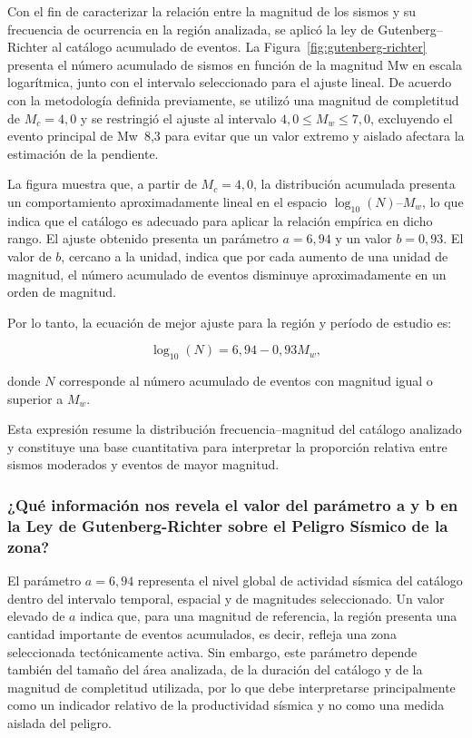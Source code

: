 \documentclass[a4paper,12pt]{article} %
\numberwithin{equation}{section} %
\numberwithin{figure}{section} %
\begin{document}
Con el fin de caracterizar la relación entre la magnitud de los sismos y su frecuencia de ocurrencia en la región analizada, se aplicó la ley de Gutenberg--Richter al catálogo acumulado de eventos. La Figura~\ref{fig:gutenberg-richter} presenta el número acumulado de sismos en función de la magnitud Mw en escala logarítmica, junto con el intervalo seleccionado para el ajuste lineal. De acuerdo con la metodología definida previamente, se utilizó una magnitud de completitud de $M_c = 4{,}0$ y se restringió el ajuste al intervalo $4{,}0 \leq M_w \leq 7{,}0$, excluyendo el evento principal de Mw~8{,}3 para evitar que un valor extremo y aislado afectara la estimación de la pendiente.

La figura muestra que, a partir de $M_c = 4{,}0$, la distribución acumulada presenta un comportamiento aproximadamente lineal en el espacio $\log_{10}(N)$--$M_w$, lo que indica que el catálogo es adecuado para aplicar la relación empírica en dicho rango. El ajuste obtenido presenta un parámetro $a = 6{,}94$ y un valor $b = 0{,}93$. El valor de $b$, cercano a la unidad, indica que por cada aumento de una unidad de magnitud, el número acumulado de eventos disminuye aproximadamente en un orden de magnitud.

Por lo tanto, la ecuación de mejor ajuste para la región y período de estudio es:

\[
\log_{10}\left(N\right) = 6{,}94 - 0{,}93M_w,
\]

donde $N$ corresponde al número acumulado de eventos con magnitud igual o superior a $M_w$.

Esta expresión resume la distribución frecuencia--magnitud del catálogo analizado y constituye una base cuantitativa para interpretar la proporción relativa entre sismos moderados y eventos de mayor magnitud.

\subsubsection{¿Qué información nos revela el valor del parámetro a y b en la Ley de Gutenberg-Richter sobre
el Peligro Sísmico de la zona?}
El parámetro $a = 6{,}94$ representa el nivel global de actividad sísmica del catálogo dentro del intervalo temporal, espacial y de magnitudes seleccionado. Un valor elevado de $a$ indica que, para una magnitud de referencia, la región presenta una cantidad importante de eventos acumulados, es decir, refleja una zona seleccionada tectónicamente activa. Sin embargo, este parámetro depende también del tamaño del área analizada, de la duración del catálogo y de la magnitud de completitud utilizada, por lo que debe interpretarse principalmente como un indicador relativo de la productividad sísmica y no como una medida aislada del peligro.
\end{document}
